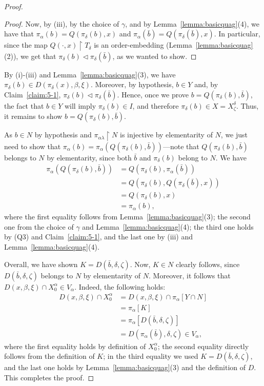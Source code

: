 \documentclass[10pt,a4paper]{amsart}
\begin{document}
\begin{proof}
\begin{proof}
Now, by (iii), by the choice of $\gamma$, and by Lemma~\ref{lemma:basicquag}(4), we have that $\pi_\alpha(b) = Q(\pi_\delta(b), x)$ and $\pi_\alpha(\bar{b}) = Q(\pi_\delta(\bar{b}), x)$. In particular, since the map $Q(\cdot, x) \upharpoonright T_\delta$ is an order-embedding  (Lemma~\ref{lemma:basicquag}(2)), we get that $\pi_\delta(b) \lhd \pi_\delta(\bar{b})$, as we wanted to show.
\end{proof}

By (i)-(iii) and Lemma~\ref{lemma:basicquag}(3), we have $\pi_\delta(b) \in D(\pi_\delta(x), \beta, \xi)$. Moreover, by hypothesis, $b \in Y$ and, by Claim~\ref{claim:5-1}, $\pi_\delta(b) \lhd \pi_\delta(\bar{b})$. Hence, once we prove $b = Q(\pi_\delta(b), \bar{b})$, the fact that $b \in Y$ will imply $\pi_\delta(b) \in I$, and therefore $\pi_\delta(b) \in X = X^\delta_\zeta$. Thus, it remains to show $b = Q(\pi_\delta(b), \bar{b})$. 

As $b \in N$ by hypothesis and $\pi_{\alpha \lambda} \upharpoonright N$ is injective by elementarity of $N$, we just need to show that $\pi_\alpha(b) = \pi_\alpha(Q(\pi_\delta(b), \bar{b}))$---note that $Q(\pi_\delta(b), \bar{b})$ belongs to $N$ by elementarity, since both $\bar{b}$ and $\pi_\delta(b)$ belong to $N$. We have
\begin{align*}
\pi_\alpha(Q(\pi_\delta(b), \bar{b})) &= Q(\pi_\delta(b), \pi_\alpha(\bar{b}))\\&= Q(\pi_\delta(b), Q(\pi_\delta(\bar{b}), x)) \\&= Q(\pi_\delta(b), x) \\&= \pi_\alpha(b),
\end{align*}
where the first equality follows from Lemma~\ref{lemma:basicquag}(3); the second one from the choice of $\gamma$ and Lemma~\ref{lemma:basicquag}(4); the third one holds by (Q3) and Claim~\ref{claim:5-1}, and the last one by (iii) and Lemma~\ref{lemma:basicquag}(4). 

Overall, we have shown $K = D(\bar{b}, \delta, \zeta)$. Now, $K \in N$ clearly follows, since $D(\bar{b}, \delta, \zeta)$ belongs to $N$ by elementarity of $N$.  Moreover, it follows that $D(x, \beta, \xi) \cap X^\alpha_0 \in V_\alpha$. Indeed, the following holds:
\begin{align*}
D(x, \beta, \xi) \cap X^\alpha_0 &= D(x, \beta, \xi) \cap \pi_\alpha[Y \cap N]\\&= \pi_\alpha[K]\\&= \pi_\alpha[D(\bar{b}, \delta , \zeta)] \\&= D(\pi_\alpha(\bar{b}), \delta, \zeta) \in V_\alpha,
\end{align*} 
where the first equality holds by definition of $X^\alpha_0$; the second equality directly follows from the definition of $K$; in the third equality we used $K = D(\bar{b}, \delta, \zeta)$, and the last one holds by Lemma~\ref{lemma:basicquag}(3) and the definition of $D$. This completes the proof.
\end{proof}
\end{document}
